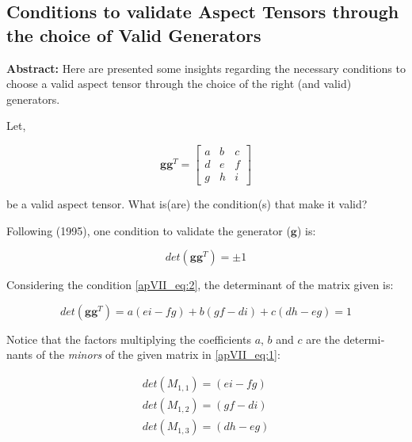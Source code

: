 \begin{otherlanguage}{english}

\begin{center}
\section*{Conditions to validate Aspect Tensors through the choice of Valid Generators}
\end{center}

\textbf{Abstract:} Here are presented some insights regarding the necessary conditions to choose a valid aspect tensor through the choice of the right (and valid) generators.

Let,

\begin{equation}
  \label{apVII_eq:1}
  \mathbf{gg}^{T} =
  \begin{bmatrix}
  	a & b & c \\
    d & e & f \\
    g & h & i 
  \end{bmatrix}
\end{equation}

be a valid aspect tensor. What is(are) the condition(s) that make it valid?

Following  (1995), one condition to validate the generator ($\mathbf{g}$) is:

\begin{equation}
  \label{apVII_eq:2}
	det(\mathbf{gg}^{T})=\pm 1
\end{equation}

Considering the condition \ref{apVII_eq:2}, the determinant of the matrix given is:

\begin{equation}
  \label{apVII_eq:3}
	det(\mathbf{gg}^{T}) = a(ei - fg) + b(gf - di) + c(dh - eg) = 1
\end{equation}

Notice that the factors multiplying the coefficients $a$, $b$ and $c$ are the determinants of the \textit{minors} of the given matrix in \ref{apVII_eq:1}:

\begin{equation}
\label{apVII_eq:4}
\begin{split}
	det(M_{1,1}) = (ei - fg) \\
	det(M_{1,2}) = (gf - di) \\
	det(M_{1,3}) = (dh - eg)
\end{split}
\end{equation}


\end{otherlanguage}
